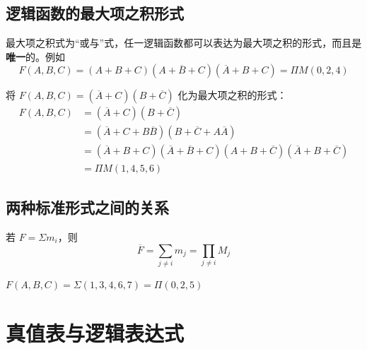 \subsection{逻辑函数的最大项之积形式}
\label{sec:逻辑函数的最大项之积形式}

\begin{theorem}[最大项之积形式]
	最大项之积式为“或与”式，任一逻辑函数都可以表达为最大项之积的形式，而且是\textbf{唯一}的。例如
	\begin{equation}
		F(A,B,C)=(A+B+C)(A+\overline{B}+C)(\overline{A}+B+C)=\Pi M(0,2,4)
		\label{eq:标准形式:最大项之积}
	\end{equation}
\end{theorem}

\begin{example}
	将 $F(A,B,C)=(\overline{A}+C)(B+\overline{C})$ 化为最大项之积的形式：
	\begin{equation}
		\begin{aligned}
			F(A,B,C) &= (\overline{A}+C)(B+\overline{C}) \\
			&= (\overline{A}+C+B\overline{B})(B+\overline{C}+A\overline{A}) \\
			&= (\overline{A}+B+C)(\overline{A}+\overline{B}+C)(A+B+\overline{C})(\overline{A}+B+\overline{C}) \\
			&= \Pi M(1,4,5,6)
		\end{aligned}
		\label{eq:标准形式:最大项之积例}
	\end{equation}
\end{example}

\subsection{两种标准形式之间的关系}
\label{sec:两种标准形式之间的关系}

\begin{theorem}[两种标准形式之间的关系]
	若 $F=\Sigma m_i$，则
	\begin{equation}
		\overline{F}=\sum_{j\neq i}m_j=\prod_{j\neq i}M_j
		\label{eq:标准形式:两种形式关系}
	\end{equation}
\end{theorem}

\begin{example}
	$F(A,B,C)=\Sigma(1,3,4,6,7)=\Pi(0,2,5)$
\end{example}

\section{真值表与逻辑表达式}
\label{sec:真值表与逻辑表达式}

